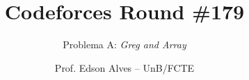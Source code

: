 \title{Codeforces Round \#179}
\subtitle{Problema A: \textit{Greg and Array}}
\author{Prof. Edson Alves -- UnB/FCTE}
\date{}
